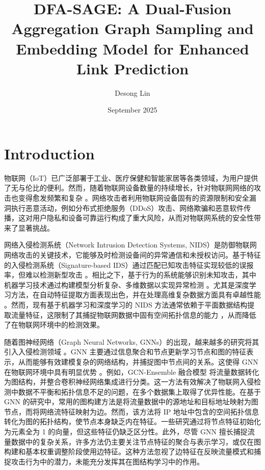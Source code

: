 \documentclass{article}
\title{DFA-SAGE: A Dual-Fusion Aggregation Graph Sampling and Embedding Model for Enhanced Link Prediction}
\author{Desong Lin}
\date{September 2025}
\begin{document}
\maketitle

\section{Introduction}

物联网（IoT）已广泛部署于工业、医疗保健和智能家居等各类领域，为用户提供了无与伦比的便利。然而，随着物联网设备数量的持续增长，针对物联网网络的攻击也变得愈发频繁和复杂 \cite{7123563}。网络攻击者利用物联网设备固有的资源限制和安全漏洞执行恶意活动，例如分布式拒绝服务（DDoS）攻击、网络欺骗和恶意软件传播，这对用户隐私和设备可靠运行构成了重大风险，从而对物联网系统的安全性带来了显著挑战。

网络入侵检测系统（Network Intrusion Detection Systems, NIDS）是防御物联网网络攻击的关键技术，它能够及时检测设备间的异常通信和未授权访问。基于特征的入侵检测系统（Signature-based IDS）通过匹配已知攻击特征实现较低的误报率，但难以检测新型攻击 \cite{electronics9101565}。相比之下，基于行为的系统能够识别未知攻击，其中机器学习技术通过构建模型分析复杂、多维数据以实现异常检测 \cite{Hazman2023} \cite{Al-Ambusaidi2024}。尤其是深度学习方法，在自动特征提取方面表现出色，并在处理高维复杂数据方面具有卓越性能 \cite{9796521} \cite{Hanafi2024} \cite{Saravanan2024}。然而，现有基于机器学习和深度学习的 NIDS 方法通常依赖于平面数据结构提取流量特征，这限制了其捕捉物联网数据中固有空间拓扑信息的能力 \cite{10258187}，从而降低了在物联网环境中的检测效果。

随着图神经网络（Graph Neural Networks, GNNs）的出现，越来越多的研究将其引入入侵检测领域 \cite{ZHONG2024103821}。GNN 主要通过信息聚合和节点更新学习节点和图的特征表示，从而能够有效建模复杂的网络结构，并捕捉图中节点间的关系。这使得 GNN 在物联网环境中具有明显优势 \cite{sanchez-lengeling2021a}。例如，GCN-Ensemble 融合模型 \cite{Mittal2024} 将流量数据转化为图结构，并整合卷积神经网络集成进行分类。这一方法有效解决了物联网入侵检测中数据不平衡和拓扑信息不足的问题，在多个数据集上取得了优异性能。在基于 GNN 的研究中，常用的图构建方法是将流量数据中的源地址和目标地址映射为图节点，而将网络流特征映射为边。然而，该方法将 IP 地址中包含的空间拓扑信息转化为图的拓扑结构，使节点本身缺乏内在特征。一些研究通过将节点特征初始化为元素全为 1 的向量，但这些特征仍缺乏区分性。此外，尽管 GNN 擅长捕捉流量数据中的复杂关系，许多方法仍主要关注节点特征的聚合与表示学习，或仅在图构建和基本权重调整阶段使用边特征。这种方法忽视了边特征在反映流量模式和捕捉攻击行为中的潜力，未能充分发挥其在图结构学习中的作用。
\end{document}
